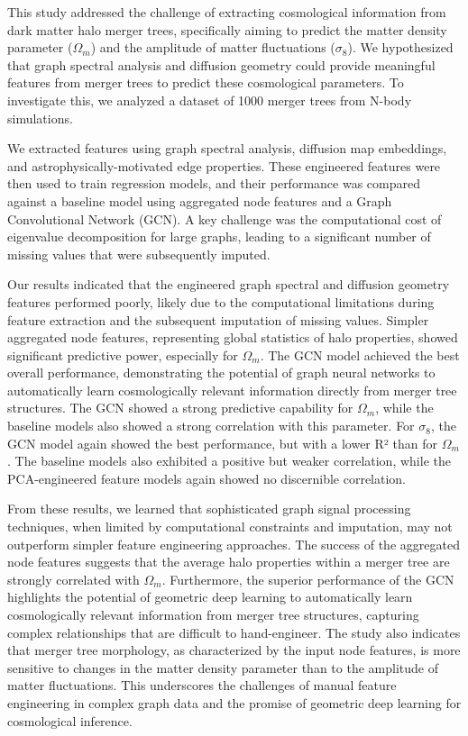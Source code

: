 \documentclass[twocolumn]{aastex631}
\begin{document}
This study addressed the challenge of extracting cosmological information from dark matter halo merger trees, specifically aiming to predict the matter density parameter ($\Omega_m$) and the amplitude of matter fluctuations ($\sigma_8$). We hypothesized that graph spectral analysis and diffusion geometry could provide meaningful features from merger trees to predict these cosmological parameters. To investigate this, we analyzed a dataset of 1000 merger trees from N-body simulations.

We extracted features using graph spectral analysis, diffusion map embeddings, and astrophysically-motivated edge properties. These engineered features were then used to train regression models, and their performance was compared against a baseline model using aggregated node features and a Graph Convolutional Network (GCN). A key challenge was the computational cost of eigenvalue decomposition for large graphs, leading to a significant number of missing values that were subsequently imputed.

Our results indicated that the engineered graph spectral and diffusion geometry features performed poorly, likely due to the computational limitations during feature extraction and the subsequent imputation of missing values. Simpler aggregated node features, representing global statistics of halo properties, showed significant predictive power, especially for $\Omega_m$. The GCN model achieved the best overall performance, demonstrating the potential of graph neural networks to automatically learn cosmologically relevant information directly from merger tree structures. The GCN showed a strong predictive capability for $\Omega_m$, while the baseline models also showed a strong correlation with this parameter. For $\sigma_8$, the GCN model again showed the best performance, but with a lower R² than for $\Omega_m$. The baseline models also exhibited a positive but weaker correlation, while the PCA-engineered feature models again showed no discernible correlation.

From these results, we learned that sophisticated graph signal processing techniques, when limited by computational constraints and imputation, may not outperform simpler feature engineering approaches. The success of the aggregated node features suggests that the average halo properties within a merger tree are strongly correlated with $\Omega_m$. Furthermore, the superior performance of the GCN highlights the potential of geometric deep learning to automatically learn cosmologically relevant information from merger tree structures, capturing complex relationships that are difficult to hand-engineer. The study also indicates that merger tree morphology, as characterized by the input node features, is more sensitive to changes in the matter density parameter than to the amplitude of matter fluctuations. This underscores the challenges of manual feature engineering in complex graph data and the promise of geometric deep learning for cosmological inference.
\end{document}
